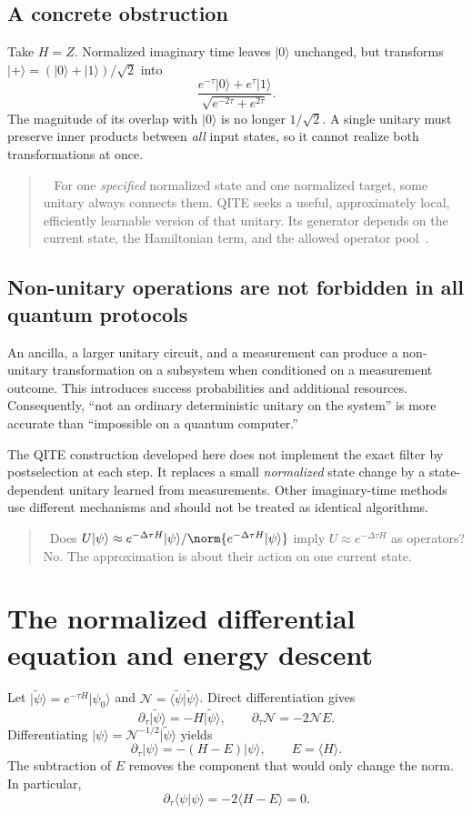 \documentclass[11pt,a4paper]{article}
\newcommand{\ket}[1]{\lvert #1\rangle}
\newcommand{\braket}[2]{\langle #1\vert #2\rangle}
\newcommand{\ex}[1]{\langle #1\rangle}
\newcommand{\dt}{\Delta\tau}
\newcommand{\lesson}[2]{\clearpage\section{#1}\label{#2}}
\newenvironment{idea}[1][Main idea]{\par\smallskip\begin{quotation}\noindent{\bfseries\textcolor{keyblue}{#1.}}\ }{\end{quotation}\smallskip}
\newcommand{\checkpoint}[1]{\begin{idea}[Pause and check]#1\end{idea}}
\begin{document}
\subsection*{A concrete obstruction}
Take $H=Z$. Normalized imaginary time leaves $\ket{0}$ unchanged, but transforms $\ket{+}=(\ket{0}+\ket{1})/\sqrt2$ into
\[
\frac{e^{-\tau}\ket{0}+e^{\tau}\ket{1}}
{\sqrt{e^{-2\tau}+e^{2\tau}}}.
\]
The magnitude of its overlap with $\ket{0}$ is no longer $1/\sqrt2$. A single unitary must preserve inner products between \emph{all} input states, so it cannot realize both transformations at once.

\begin{idea}[What QITE can ask for instead]
For one \emph{specified} normalized state and one normalized target, some unitary always connects them. QITE seeks a useful, approximately local, efficiently learnable version of that unitary. Its generator depends on the current state, the Hamiltonian term, and the allowed operator pool~\cite{motta}.
\end{idea}

\subsection*{Non-unitary operations are not forbidden in all quantum protocols}
An ancilla, a larger unitary circuit, and a measurement can produce a non-unitary transformation on a subsystem when conditioned on a measurement outcome. This introduces success probabilities and additional resources. Consequently, ``not an ordinary deterministic unitary on the system'' is more accurate than ``impossible on a quantum computer.''

The QITE construction developed here does not implement the exact filter by postselection at each step. It replaces a small \emph{normalized} state change by a state-dependent unitary learned from measurements. Other imaginary-time methods use different mechanisms and should not be treated as identical algorithms.

\checkpoint{Does $U\ket{\psi}\approx e^{-\dt H}\ket{\psi}/\norm{e^{-\dt H}\ket{\psi}}$ imply $U\approx e^{-\dt H}$ as operators? No. The approximation is about their action on one current state.}

\lesson{The normalized differential equation and energy descent}{sec:flow}
Let $\ket{\widetilde\psi}=e^{-\tau H}\ket{\psi_0}$ and $\mathcal N=\braket{\widetilde\psi}{\widetilde\psi}$. Direct differentiation gives
\[
\partial_\tau\ket{\widetilde\psi}=-H\ket{\widetilde\psi},\qquad
\partial_\tau\mathcal N=-2\mathcal N E.
\]
Differentiating $\ket{\psi}=\mathcal N^{-1/2}\ket{\widetilde\psi}$ yields
\begin{equation}
\boxed{\partial_\tau\ket{\psi}=-(H-E)\ket{\psi},\qquad E=\ex{H}.}
\label{eq:flow}
\end{equation}
The subtraction of $E$ removes the component that would only change the norm. In particular,
\[
\partial_\tau\braket{\psi}{\psi}=-2\ex{H-E}=0.
\]
\end{document}
